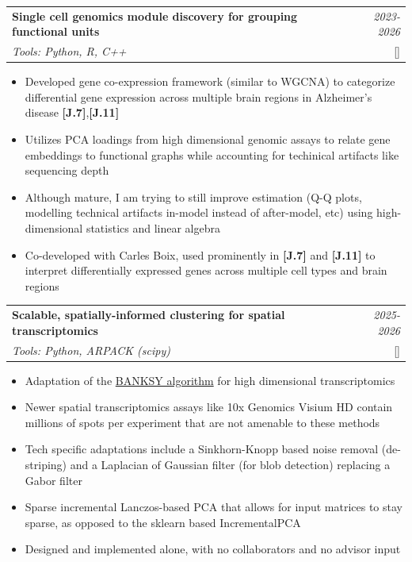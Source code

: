 \documentclass[letter,11pt]{article}
\makeatletter
\let\HREF\href
\renewcommand{\href}[2]{\HREF{#1}{\begingroup\UrlFont #2\endgroup}}
\newcommand{\resumeProject}[4]{
\vspace{0.5mm}\item
    \begin{tabular*}{0.98\textwidth}[t]{l@{\extracolsep{\fill}}r}
        \textbf{#1} & \textit{\footnotesize{#3}} \\
        \footnotesize{\textit{#2}} & \footnotesize{#4}
    \end{tabular*}
    \vspace{-2.4mm}
}
\newcommand{\resumeItemListStart}{\begin{itemize}[leftmargin=*,labelsep=1mm,itemsep=0.5mm]}
\newcommand{\resumeItemListEnd}{\end{itemize}\vspace{-2mm}}
\makeatother
\begin{document}
\resumeProject
{Single cell genomics module discovery for grouping functional units}
{Tools: Python, R, C++}
{2023-2026}
{{}[\href{https://github.com/kellislab/scdemon}{\textcolor{darkblue}{\faGithub}}]}
\resumeItemListStart
\item Developed gene co-expression framework (similar to WGCNA) to categorize differential gene expression across multiple brain regions in Alzheimer's disease \textbf{[J.7]},\textbf{[J.11]}
\item Utilizes PCA loadings from high dimensional genomic assays to relate gene embeddings to functional graphs while accounting for techinical artifacts like sequencing depth
\item Although mature, I am trying to still improve estimation (Q-Q plots, modelling technical artifacts in-model instead of after-model, etc) using high-dimensional statistics and linear algebra
\item Co-developed with Carles Boix, used prominently in \textbf{[J.7]} and \textbf{[J.11]} to interpret differentially expressed genes across multiple cell types and brain regions
\resumeItemListEnd

\resumeProject
{Scalable, spatially-informed clustering for spatial transcriptomics}
{Tools: Python, ARPACK (scipy)}
{2025-2026}
{{}[\href{https://github.com/kellislab/banksy-hd}{\textcolor{darkblue}{\faGithub}}]}
\resumeItemListStart
\item Adaptation of the \href{https://doi.org/10.1038/s41588-024-01664-3}{BANKSY algorithm} for high dimensional transcriptomics
\item Newer spatial transcriptomics assays like 10x Genomics Visium HD contain millions of spots per experiment that are not amenable to these methods
\item Tech specific adaptations include a Sinkhorn-Knopp based noise removal (de-striping) and a Laplacian of Gaussian filter (for blob detection) replacing a Gabor filter
\item Sparse incremental Lanczos-based PCA that allows for input matrices to stay sparse, as opposed to the sklearn based IncrementalPCA
\item Designed and implemented alone, with no collaborators and no advisor input
\resumeItemListEnd
\end{document}
